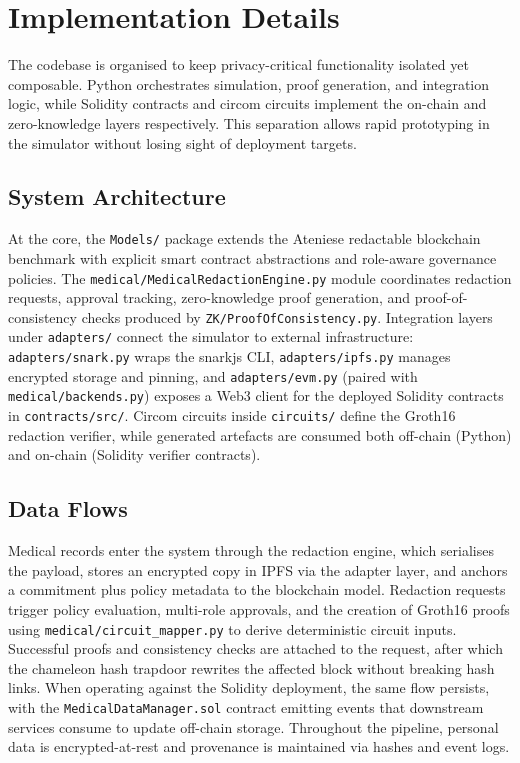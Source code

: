 \section{Implementation Details}

The codebase is organised to keep privacy-critical functionality isolated yet composable. Python orchestrates simulation, proof generation, and integration logic, while Solidity contracts and circom circuits implement the on-chain and zero-knowledge layers respectively. This separation allows rapid prototyping in the simulator without losing sight of deployment targets.

\subsection{System Architecture}
At the core, the \texttt{Models/} package extends the Ateniese redactable blockchain benchmark with explicit smart contract abstractions and role-aware governance policies. The \texttt{medical/MedicalRedactionEngine.py} module coordinates redaction requests, approval tracking, zero-knowledge proof generation, and proof-of-consistency checks produced by \texttt{ZK/ProofOfConsistency.py}. Integration layers under \texttt{adapters/} connect the simulator to external infrastructure: \texttt{adapters/snark.py} wraps the snarkjs CLI, \texttt{adapters/ipfs.py} manages encrypted storage and pinning, and \texttt{adapters/evm.py} (paired with \texttt{medical/backends.py}) exposes a Web3 client for the deployed Solidity contracts in \texttt{contracts/src/}. Circom circuits inside \texttt{circuits/} define the Groth16 redaction verifier, while generated artefacts are consumed both off-chain (Python) and on-chain (Solidity verifier contracts).

\subsection{Data Flows}
Medical records enter the system through the redaction engine, which serialises the payload, stores an encrypted copy in IPFS via the adapter layer, and anchors a commitment plus policy metadata to the blockchain model. Redaction requests trigger policy evaluation, multi-role approvals, and the creation of Groth16 proofs using \texttt{medical/circuit\_mapper.py} to derive deterministic circuit inputs. Successful proofs and consistency checks are attached to the request, after which the chameleon hash trapdoor rewrites the affected block without breaking hash links. When operating against the Solidity deployment, the same flow persists, with the \texttt{MedicalDataManager.sol} contract emitting events that downstream services consume to update off-chain storage. Throughout the pipeline, personal data is encrypted-at-rest and provenance is maintained via hashes and event logs.

